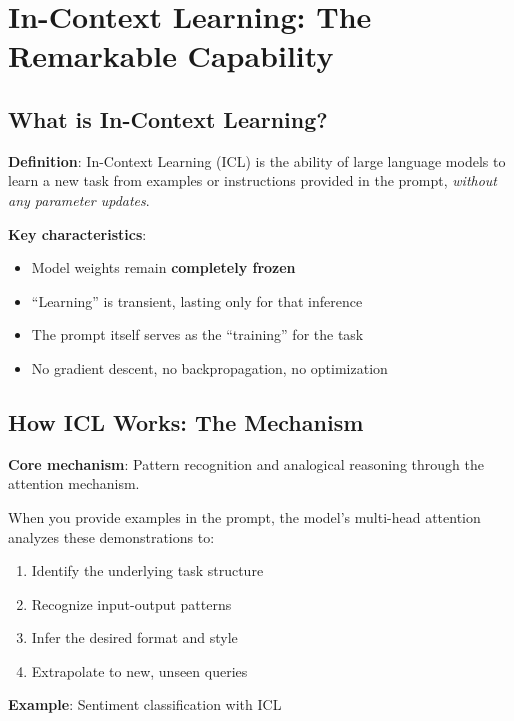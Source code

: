 \documentclass{article}
\begin{document}
\section{In-Context Learning: The Remarkable Capability}

\subsection{What is In-Context Learning?}

\textbf{Definition}: In-Context Learning (ICL) is the ability of large language models to learn a new task from examples or instructions provided in the prompt, \textit{without any parameter updates}.

\textbf{Key characteristics}:
\begin{itemize}
\item Model weights remain \textbf{completely frozen}
\item ``Learning'' is transient, lasting only for that inference
\item The prompt itself serves as the ``training'' for the task
\item No gradient descent, no backpropagation, no optimization
\end{itemize}

\begin{center}
\end{center}

\subsection{How ICL Works: The Mechanism}

\textbf{Core mechanism}: Pattern recognition and analogical reasoning through the attention mechanism.

When you provide examples in the prompt, the model's multi-head attention analyzes these demonstrations to:
\begin{enumerate}
\item Identify the underlying task structure
\item Recognize input-output patterns
\item Infer the desired format and style
\item Extrapolate to new, unseen queries
\end{enumerate}

\textbf{Example}: Sentiment classification with ICL
\end{document}
